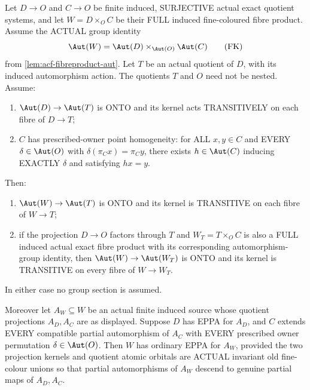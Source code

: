 \begin{lemma}
\label{lem:acf-fibreproduct-owner-kernels}
Let $D\to O$ and $C\to O$
be finite induced, SURJECTIVE
actual exact quotient systems,
and let $W=D\times_O C$ be
their FULL induced fine-coloured
fibre product. Assume the ACTUAL
group identity
\[
   \Aut(W)=\Aut(D)\times_{\Aut(O)}
                                \Aut(C)
\tag{FK}\label{eq:acf-fibreproduct-kernel-action}
\]
from \cref{lem:acf-fibreproduct-aut}.
Let $T$ be an actual quotient of $D$, with its induced
automorphism action. The quotients $T$ and $O$ need not be nested.
Assume:
\begin{enumerate}[label=(\roman*)]
\item $\Aut(D)\to\Aut(T)$
is ONTO and its kernel acts
TRANSITIVELY on each fibre
of $D\to T$;
\item $C$ has prescribed-owner
point homogeneity: for ALL
$x,y\in C$ and EVERY
$\delta\in\Aut(O)$ with
$\delta(\pi_Cx)=\pi_Cy$,
there exists $h\in\Aut(C)$
inducing EXACTLY $\delta$
and satisfying $hx=y$.
\end{enumerate}
Then:
\begin{enumerate}[label=(\alph*)]
\item $\Aut(W)\to\Aut(T)$
is ONTO and its kernel is
TRANSITIVE on each fibre
of $W\to T$;
\item if the projection $D\to O$ factors through $T$ and
$W_T=T\times_O C$
is also a FULL induced
actual exact fibre product
with its corresponding
automorphism-group identity,
then $\Aut(W)\to\Aut(W_T)$
is ONTO and its kernel is
TRANSITIVE on every fibre
of $W\to W_T$.
\end{enumerate}
In either case no group section
is assumed.

Moreover let $A_W\subseteq W$
be an actual finite induced
source whose quotient
projections $A_D,A_C$
are as displayed.
Suppose $D$ has EPPA for
$A_D$, and $C$ extends
EVERY compatible partial
automorphism of $A_C$
with EVERY prescribed
owner permutation
$\delta\in\Aut(O)$.
Then $W$ has ordinary
EPPA for $A_W$, provided
the two projection kernels
and quotient atomic orbitals
are ACTUAL invariant old
fine-colour unions so that
partial automorphisms of
$A_W$ descend to genuine
partial maps of $A_D,A_C$.
\end{lemma}
